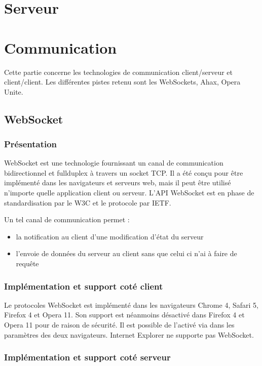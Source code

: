 \documentclass[a4paper,10pt]{report}
\begin{document}
\chapter{Serveur}


\chapter{Communication}

Cette partie concerne les technologies de communication client/serveur et 
client/client. Les différentes pistes retenu sont les WebSockets, Ahax, 
Opera Unite.

  \section{WebSocket}

    \subsection{Présentation}

WebSocket est une technologie fournissant un canal de communication bidirectionnel 
et fullduplex à travers un socket TCP. Il a été conçu pour être implémenté dans 
les navigateurs et serveurs web, mais il peut être utilisé n'importe quelle 
application client ou serveur. L'API WebSocket est en phase de standardisation 
par le W3C et le protocole par IETF.


Un tel canal de communication permet :
\begin{itemize}
  \item la notification au client d'une modification d'état du serveur
  \item l'envoie de données du serveur au client sans que celui ci n'ai à faire de requête
\end{itemize}


    \subsection{Implémentation et support coté client}

Le protocoles WebSocket est implémenté dans les navigateurs Chrome 4, Safari 5, 
Firefox 4 et Opera 11. Son support est néanmoins désactivé dans Firefox 4 et 
Opera 11 pour de raison de sécurité. Il est possible de l'activé via dans les 
paramètres des deux navigateurs. Internet Explorer ne supporte pas WebSocket.


    \subsection{Implémentation et support coté serveur}
\end{document}
